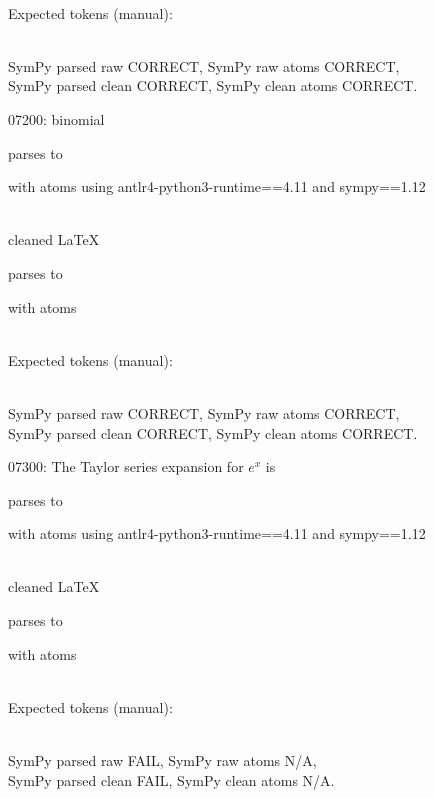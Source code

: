 \documentclass{article}
\begin{document}
\ \\
Expected tokens (manual):



\ \\
SymPy parsed raw CORRECT, 
SymPy raw atoms CORRECT, \\
SymPy parsed clean CORRECT, 
SymPy clean atoms CORRECT.

\hrulefill

07200:
binomial

parses to

with atoms
using antlr4-python3-runtime==4.11 and sympy==1.12

\ \\
cleaned \LaTeX

parses to

with atoms


\ \\
Expected tokens (manual):



\ \\
SymPy parsed raw CORRECT, 
SymPy raw atoms CORRECT, \\
SymPy parsed clean CORRECT, 
SymPy clean atoms CORRECT.

\hrulefill

07300:
The Taylor series expansion for $e^x$ is 

parses to

with atoms
using antlr4-python3-runtime==4.11 and sympy==1.12

\ \\
cleaned \LaTeX

parses to

with atoms


\ \\
Expected tokens (manual):


\ \\
SymPy parsed raw FAIL, 
SymPy raw atoms N/A, \\
SymPy parsed clean FAIL, 
SymPy clean atoms N/A.
\end{document}
